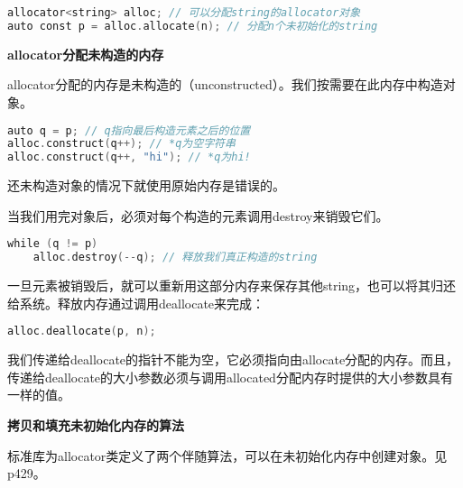 \documentclass[
  a4paper,
  oneside,tablecaptionabove
]{scrbook}
\begin{document}
\begin{lstlisting}[language={C++}]
allocator<string> alloc; // 可以分配string的allocator对象
auto const p = alloc.allocate(n); // 分配n个未初始化的string
\end{lstlisting}

\textbf{allocator分配未构造的内存}

allocator分配的内存是未构造的（unconstructed）。我们按需要在此内存中构造对象。

\begin{lstlisting}[language={C++}]
auto q = p; // q指向最后构造元素之后的位置
alloc.construct(q++); // *q为空字符串
alloc.construct(q++, "hi"); // *q为hi!
\end{lstlisting}

还未构造对象的情况下就使用原始内存是错误的。

当我们用完对象后，必须对每个构造的元素调用destroy来销毁它们。

\begin{lstlisting}[language={C++}]
while (q != p)
    alloc.destroy(--q); // 释放我们真正构造的string
\end{lstlisting}

一旦元素被销毁后，就可以重新用这部分内存来保存其他string，也可以将其归还给系统。释放内存通过调用deallocate来完成：

\begin{lstlisting}[language={C++}]
alloc.deallocate(p, n);
\end{lstlisting}

我们传递给deallocate的指针不能为空，它必须指向由allocate分配的内存。而且，传递给deallocate的大小参数必须与调用allocated分配内存时提供的大小参数具有一样的值。

\textbf{拷贝和填充未初始化内存的算法}

标准库为allocator类定义了两个伴随算法，可以在未初始化内存中创建对象。见p429。
\end{document}
